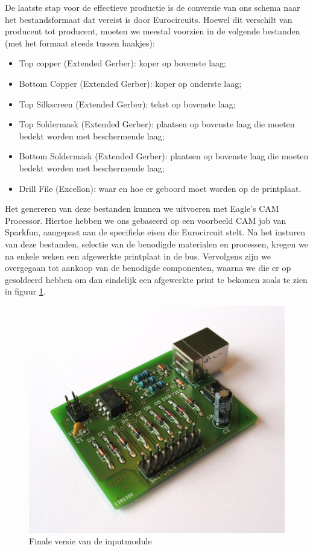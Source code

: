 De laatste stap voor de effectieve productie is de conversie van ons schema naar het bestandsformaat dat vereist is door Eurocircuits. Hoewel dit verschilt van producent tot producent, moeten we meestal voorzien in de volgende bestanden (met het formaat steeds tussen haakjes):
\begin{itemize}
  \item Top copper (Extended Gerber): koper op bovenste laag;
  \item Bottom Copper (Extended Gerber): koper op onderste laag;
  \item Top Silkscreen (Extended Gerber): tekst op bovenste laag;
  \item Top Soldermask (Extended Gerber): plaatsen op bovenste laag die moeten bedekt worden met beschermende laag;
  \item Bottom Soldermask (Extended Gerber): plaatsen op bovenste laag die moeten bedekt worden met beschermende laag;
  \item Drill File (Excellon): waar en hoe er geboord moet worden op de printplaat.
\end{itemize}

Het genereren van deze bestanden kunnen we uitvoeren met Eagle's CAM Processor. Hiertoe hebben we ons gebaseerd op een voorbeeld CAM job van Sparkfun, aangepast aan de specifieke eisen die Eurocircuit stelt. Na het insturen van deze bestanden, selectie van de benodigde materialen en processen, kregen we na enkele weken een afgewerkte printplaat in de bus. Vervolgens zijn we overgegaan tot aankoop van de benodigde componenten, waarna we die er op gesoldeerd hebben om dan eindelijk een afgewerkte print te bekomen zoals te zien in figuur \ref{fig:inputmodule}.

\begin{figure}
	\includegraphics[width=\textwidth]{afbeeldingen/inputmodule_afgewerkt}
	\caption{Finale versie van de inputmodule}
	\label{fig:inputmodule}
\end{figure}


